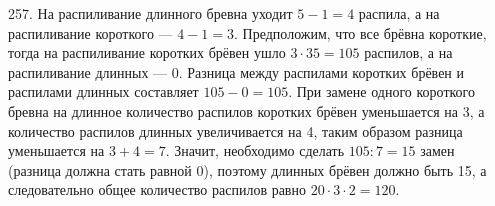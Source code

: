 257. На распиливание длинного бревна уходит $5-1=4$ распила, а на распиливание короткого --- $4-1=3.$ Предположим, что все брёвна короткие, тогда на распиливание коротких брёвен ушло $3\cdot35=105$ распилов, а на распиливание длинных --- 0. Разница между распилами коротких брёвен и распилами длинных составляет $105-0=105.$ При замене одного короткого бревна на длинное количество распилов коротких брёвен уменьшается на 3, а количество распилов длинных увеличивается на 4, таким образом разница уменьшается на $3+4=7.$ Значит, необходимо сделать $105:7=15$ замен (разница должна стать равной 0), поэтому длинных брёвен должно быть 15, а следовательно общее количество распилов равно $20\cdot3\cdot2=120.$\\
